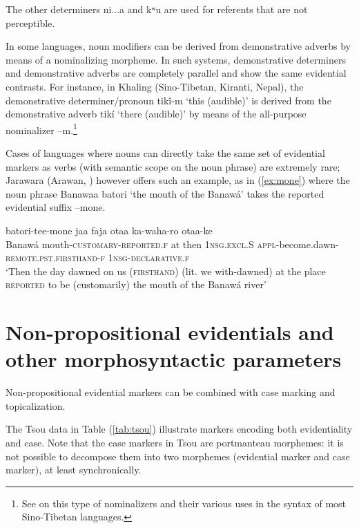 \documentclass[oneside,a4paper,11pt]{article}
\newcommand{\ipa}[1]{{\phon \mbox{#1}}} %
\begin{document}
The other determiners \ipa{ni...a} and \ipa{kʷu} are used for referents that are not perceptible.

In some languages, noun modifiers can be derived from demonstrative adverbs by means of a nominalizing morpheme. In such systems, demonstrative determiners and demonstrative adverbs are completely parallel and show the same evidential contrasts. For instance, in Khaling (Sino-Tibetan, Kiranti, Nepal), the demonstrative determiner/pronoun \ipa{tikî-m} `this (audible)' is derived from the demonstrative adverb \ipa{tikí} `there (audible)' by means of the all-purpose nominalizer \ipa{--m}.\footnote{See \citet{bickel99nmlz} on this type of nominalizers and their various uses in the syntax of most Sino-Tibetan languages.}

Cases of languages where nouns can directly take the same set of evidential markers as verbs (with semantic scope on the noun phrase) are extremely rare; Jarawara (Arawan, \citealt[88, ex 3.19]{aikhenvald06}) however offers such an example, as in (\ref{ex:mone}) where the noun phrase \ipa{Banawaa} \ipa{batori} `the mouth of the Banawá' takes the reported evidential suffix \ipa{--mone}.

\begin{exe}
\ex \label{ex:mone}
\gll  \ipa{Banawaa} \ipa{batori-tee-mone} \ipa{jaa} \ipa{faja} \ipa{otaa} \ipa{ka-waha-ro} \ipa{otaa-ke} \\
Banawá mouth-\textsc{customary-reported.f} at then \textsc{1nsg.excl}.S \textsc{appl}-become.dawn-\textsc{remote.pst.firsthand-f} \textsc{1nsg-declarative.f} \\
\glt ‘Then the day dawned on us (\textsc{firsthand}) (lit. we with-dawned) at the
place \textsc{reported} to be (customarily) the mouth of the Banawá river’
\end{exe}

 \section{Non-propositional evidentials and other morphosyntactic parameters} \label{sec:parameter}
Non-propositional evidential markers  can be combined with  case marking and topicalization.

The Tsou data in Table (\ref{tab:tsou})   illustrate markers encoding both evidentiality and case. Note that the case markers in Tsou are portmanteau morphemes: it is not possible to decompose them into two morphemes (evidential marker and case marker), at least synchronically.  
 
\end{document}
